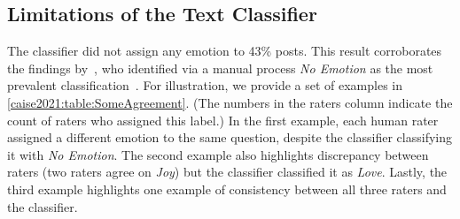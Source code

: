 \subsection{Limitations of the Text Classifier}
The classifier did not assign any emotion to 43\% posts.  This result corroborates the findings by~\citeauthor{murgia2014}, who identified via a manual process \textit{No Emotion} as the most prevalent classification~\citep{murgia2014}. For illustration, we provide a set of examples in \cref{caise2021:table:SomeAgreement}. (The numbers in the raters column indicate the count of raters who assigned this label.) In the first example, each human rater assigned a different emotion to the same question, despite the classifier classifying it with \textit{No Emotion}. The second example also highlights discrepancy between raters (two raters agree on \textit{Joy}) but the classifier classified it as \textit{Love}. Lastly, the third example highlights one example of consistency between all three raters and the classifier.

